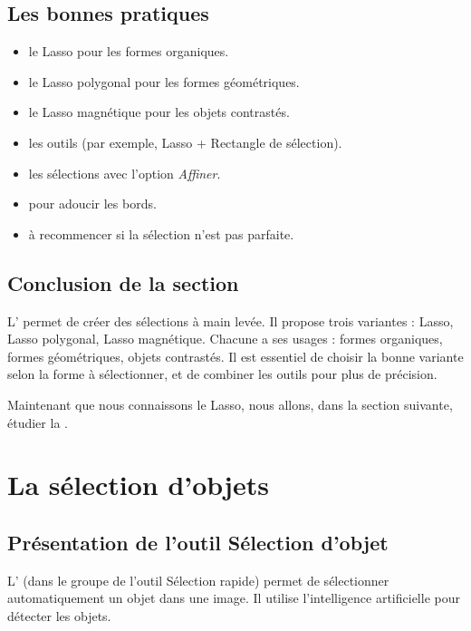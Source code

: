 \subsection{Les bonnes pratiques}

\begin{itemize}
    \item {} le Lasso pour les formes organiques.
    \item {} le Lasso polygonal pour les formes géométriques.
    \item {} le Lasso magnétique pour les objets contrastés.
    \item {} les outils (par exemple, Lasso + Rectangle de sélection).
    \item {} les sélections avec l'option \emph{Affiner}.
    \item {} pour adoucir les bords.
    \item {} à recommencer si la sélection n'est pas parfaite.
\end{itemize}

\subsection*{Conclusion de la section}

L' permet de créer des sélections à main levée. Il propose trois variantes : Lasso, Lasso polygonal, Lasso magnétique. Chacune a ses usages : formes organiques, formes géométriques, objets contrastés. Il est essentiel de choisir la bonne variante selon la forme à sélectionner, et de combiner les outils pour plus de précision.

Maintenant que nous connaissons le Lasso, nous allons, dans la section suivante, étudier la .

\section{La sélection d'objets}

\subsection{Présentation de l'outil Sélection d'objet}

L' (dans le groupe de l'outil Sélection rapide) permet de sélectionner automatiquement un objet dans une image. Il utilise l'intelligence artificielle pour détecter les objets.

